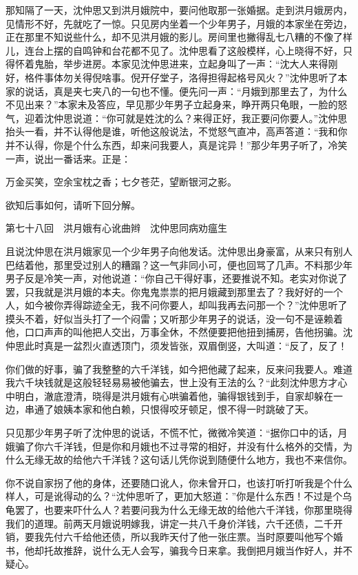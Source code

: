 \documentclass[12pt,UTF8]{ctexbook}
\begin{document}
{{{那知隔了一天，沈仲思又到洪月娥院中，要问他取那一张婚据。走到洪月娥房内，见情形不好，先就吃了一惊。只见房内坐着一个少年男子，月娥的本家坐在旁边，正在那里不知说些什么，却不见洪月娥的影儿。房间里也撇得乱七八糟的不像了样儿，连台上摆的自鸣钟和台花都不见了。沈仲思看了这般模样，心上晓得不好，只得怀着鬼胎，举步进房。本家见沈仲思进来，立起身叫了一声：“沈大人来得刚好，格件事体勿关得倪啥事。倪开仔堂子，洛得担得起格号风火？”沈仲思听了本家的说话，真是夹七夹八的一句也不懂。便先问一声：“月娥到那里去了，为什么不见出来？”本家未及答应，早见那少年男子立起身来，睁开两只龟眼，一脸的怒气，迎着沈仲思说道：“你可就是姓沈的么？来得正好，我正要问你要人。”沈仲思抬头一看，并不认得他是谁，听他这般说法，不觉怒气直冲，高声答道：“我和你并不认得，你是个什么东西，却来问我要人，真是诧异！”那少年男子听了，冷笑一声，说出一番话来。正是：

万金买笑，空余宝枕之香；七夕苍茫，望断银河之影。

欲知后事如何，请听下回分解。





第七十八回　洪月娥有心讹曲辫　沈仲思同病劝瘟生





且说沈仲思在洪月娥家见一个少年男子向他发话。沈仲思出身豪富，从来只有别人巴结着他，那里受过别人的糟蹋？这一气非同小可，便也回骂了几声。不料那少年男子反是冷笑一声，对他说道：“你自己干得好事，还要推说不知。老实对你说了罢，只我就是洪月娥的本夫。你鬼鬼祟祟的把月娥藏到那里去了？我好好的一个人，如今被你弄得踪迹全无，我不问你要人，却叫我再去问那一个？”沈仲思听了摸头不着，好似当头打了一个闷雷；又听那少年男子的说话，没一句不是诬赖着他，口口声声的叫他把人交出，万事全休，不然便要把他扭到捕房，告他拐骗。沈仲思此时真是一盆烈火直透顶门，须发皆张，双眉倒竖，大叫道：“反了，反了！

你们做的好事，骗了我整整的六千洋钱，如今把他藏了起来，反来问我要人。难道我六千块钱就是这般轻轻易易被他骗去，世上没有王法的么？“此刻沈仲思方才心中明白，澈底澄清，晓得是洪月娥有心哄骗着他，骗得银钱到手，自家却躲在一边，串通了娘姨本家和他白赖，只恨得咬牙顿足，恨不得一时跳破了天。

只见那少年男子听了沈仲思的说话，不慌不忙，微微冷笑道：“据你口中的话，月娥骗了你六千洋钱，但是你和月娥也不过寻常的相好，并没有什么格外的交情，为什么无缘无故的给他六千洋钱？这句话儿凭你说到随便什么地方，我也不来信你。

你不说自家拐了他的身体，还要随口讹人，你未曾开口，也该打听打听我是个什么样人，可是讹得动的么？“沈仲思听了，更加大怒道：”你是什么东西！不过是个乌龟罢了，也要来吓什么人？若要问我为什么无缘无故的给他六千洋钱，你那里晓得我们的道理。前两天月娥说明嫁我，讲定一共八千身价洋钱，六千还债，二千开销，要我先付六千给他还债，所以我昨天付了他一张庄票。当时原要叫他写个婚书，他却托故推辞，说什么无人会写，骗我今日来拿。我倒把月娥当作好人，并不疑心。

}}}
\end{document}

